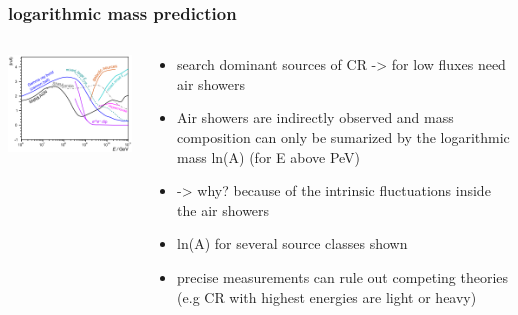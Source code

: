 \documentclass[aspectratio=1610, 9pt]{beamer}
\begin{document}
\begin{frame}\frametitle{logarithmic mass prediction}
  \begin{columns}
    \begin{column}[c]{0.48\textwidth}
      \includegraphics{lnA_left.png}
    \end{column}
    \begin{column}[c]{0.48\textwidth}
      \begin{itemize}
        \item search dominant sources of CR -> for low fluxes need air showers
        \item Air showers are indirectly observed and mass composition can only be sumarized by the logarithmic mass ln(A) (for E above PeV)
        \item -> why? because of the intrinsic fluctuations inside the air showers
        \item ln(A) for several source classes shown
        \item precise measurements can rule out competing theories (e.g CR with highest energies are light or heavy)
      \end{itemize}
    \end{column}
  \end{columns}
\end{frame}
\end{document}
